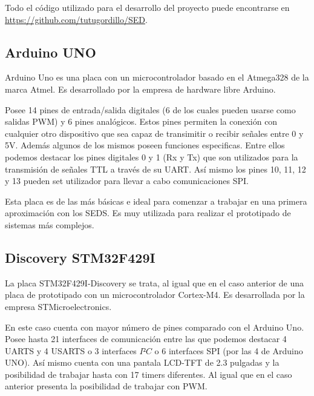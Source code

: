 Todo el c\'odigo utilizado para el desarrollo del proyecto puede
encontrarse en \url{https://github.com/tutugordillo/SED}.
\subsection{Arduino UNO}\label{subsec:arduino}
Arduino Uno es una placa con un microcontrolador basado en el
Atmega328 de la marca Atmel. Es desarrollado por la empresa de
hardware libre Arduino.

 Posee 14 pines de entrada/salida digitales (6 de los cuales
pueden usarse como salidas PWM) y 6 pines anal\'ogicos. Estos pines
permiten la conexi\'on con cualquier otro dispositivo que sea capaz de
transimitir o recibir señales entre 0 y 5V. Adem\'as algunos de los
mismos poseen funciones especificas. Entre ellos podemos destacar 
los pines digitales 0 y 1 (Rx y Tx) que son utilizados para la transmisi\'on de
señales TTL a trav\'es de su UART. As\'i mismo los pines 10, 11, 12 y
13 pueden set utilizador para llevar a cabo comunicaciones SPI.

Esta placa es de las m\'as b\'asicas e ideal para comenzar a trabajar
en una primera aproximaci\'on con los SEDS. Es muy utilizada para
realizar el prototipado de sistemas m\'as complejos.

\subsection{Discovery STM32F429I}\label{subsec:discovery}

La placa STM32F429I-Discovery se trata, al igual que en el caso
anterior de una placa de prototipado con un microcontrolador
Cortex-M4. Es desarrollada por la empresa STMicroelectronics. 

En este
caso cuenta con mayor n\'umero de pines comparado con el Arduino
Uno. Posee hasta 21 interfaces de comunicaci\'on entre las que podemos
destacar 4 UARTS y 4 USARTS o 3 interfaces $I²C$ o 6 interfaces SPI
(por las 4 de Arduino UNO). As\'i mismo cuenta
con una pantala LCD-TFT de 2.3 pulgadas y la posibilidad de trabajar
hasta con 17 timers diferentes. Al igual que en el caso anterior
presenta la posibilidad de trabajar con PWM.

